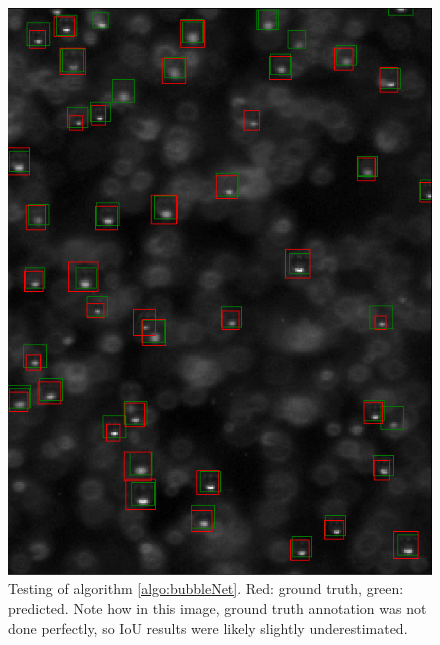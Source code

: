 			\begin{figure}[h!]
				\centering
				\includegraphics[scale=0.8]{images/bubbleNet_validation_result.png}
				\caption{Testing of algorithm \ref{algo:bubbleNet}. Red: ground truth, green: predicted. Note how in this image, ground truth annotation was not done perfectly, so IoU results were likely slightly underestimated.}
				\label{fig:bubbleNet_result}
			\end{figure}



